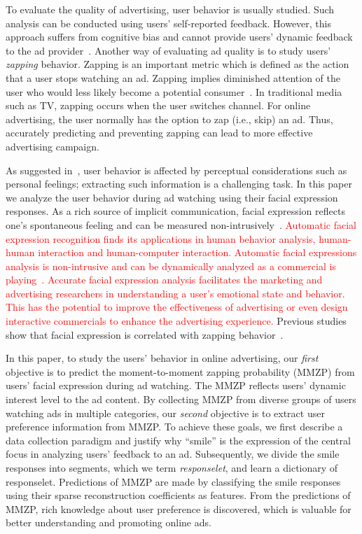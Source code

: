 \documentclass[twoside,leqno,twocolumn]{article}
\newcommand{\Songfan}[1]{\textcolor{red}{#1}}
\begin{document}
To evaluate the quality of advertising, user behavior is usually studied. Such analysis can be conducted using users' self-reported feedback. However, this approach suffers from cognitive bias and cannot provide users' dynamic feedback to the ad provider~\cite{Poels06}. Another way of evaluating ad quality is to study users' \textit{zapping} behavior. Zapping is an important metric which is defined as the action that a user stops watching an ad. Zapping implies diminished attention of the user who would less likely become a potential consumer~\cite{Elpers03}. In traditional media such as TV, zapping occurs when the user switches channel. For online advertising, the user normally has the option to zap (i.e., skip) an ad. Thus, accurately predicting and preventing zapping can lead to more effective advertising campaign. 

As suggested in~\cite{Abbasi_15}, user behavior is affected by perceptual considerations such as personal feelings; extracting such information is a challenging task. In this paper we analyze the user behavior during ad watching using their facial expression responses. As a rich source of implicit communication, facial expression reflects one's spontaneous feeling and can be measured non-intrusively~\cite{Ekman93}. \Songfan{Automatic
facial expression recognition finds its applications in human
behavior analysis, human-human interaction and human-computer
interaction. Automatic facial expressions analysis is non-intrusive and can
be dynamically analyzed as a commercial is
playing~\cite{Teixeira12}. Accurate facial expression analysis
facilitates the marketing and advertising researchers in
understanding a user's emotional state and behavior. This has
the potential to improve the effectiveness of advertising or even
design interactive commercials to enhance the advertising
experience.} Previous studies show that facial expression is correlated with zapping behavior~\cite{Yang_TAC14, Yang_FG15}.  

In this paper, to study the users' behavior in online advertising, our \textit{first} objective is to predict the moment-to-moment zapping probability (MMZP) from users' facial expression during ad watching. The MMZP reflects users' dynamic interest level to the ad content. By collecting MMZP from diverse groups of users watching ads in multiple categories, our \textit{second} objective is to extract user preference information from MMZP. To achieve these goals, we first describe a data collection paradigm and justify why ``smile'' is the expression of the central focus in analyzing users' feedback to an ad. Subsequently, we divide the smile responses into segments, which we term \textit{responselet}, and learn a dictionary of responselet. Predictions of MMZP are made by classifying the smile responses using their sparse reconstruction coefficients as features. From the predictions of MMZP, rich knowledge about user preference is discovered, which is valuable for better understanding and promoting online ads. 
\end{document}
